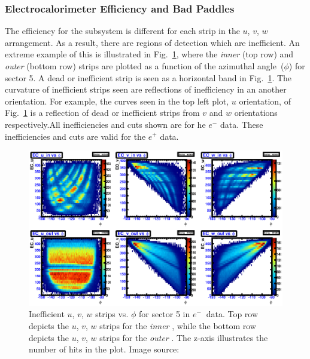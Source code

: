 \subsubsection{\label{sec:calib.ec.eff}Electrocalorimeter Efficiency and Bad Paddles}
The efficiency for the  subsystem is different for each strip in the $u$, $v$, $w$ arrangement. As a result, there are regions of detection which are inefficient. An extreme example of this is illustrated in Fig.~\ref{fig:neg:ec.sec5}, where the  \emph{inner} (top row) and \emph{outer} (bottom row) strips are plotted as a function of the azimuthal angle~($\phi$) for sector 5. A dead or inefficient strip is seen as a horizontal band in Fig.~\ref{fig:neg:ec.sec5}.  The curvature of inefficient strips seen are reflections of inefficiency in an another orientation. For example, the curves seen in the top left plot, $u$ orientation, of Fig.~\ref{fig:neg:ec.sec5} is a reflection of dead or inefficient strips from $v$ and $w$ orientations respectively.All inefficiencies and cuts shown are for he $e^-$ data. These inefficiencies and cuts are valid for the $e^+$ data.
%
\begin{figure}[h!]\begin{center}
\includegraphics[width=\figwidth,height=\hfigheight]{figures/calib/ec/pim_ecuvw_phi_NOKnockout_sec5.eps}
\caption[Inefficient  $u$, $v$, $w$ strips vs. $\phi$ for sector 5 in  $e^{-} \ $ data]{\label{fig:neg:ec.sec5}Inefficient  $u$, $v$, $w$ strips vs. $\phi$ for sector 5 in  $e^{-} \ $ data. Top row depicts the $u$, $v$, $w$ strips for the \emph{inner} , while the bottom row depicts the $u$, $v$, $w$ strips for the \emph{outer} . The z-axis illustrates the number of hits in the plot. Image source:~\cite{clas.thesis.kunkel}}
\end{center}\end{figure}
